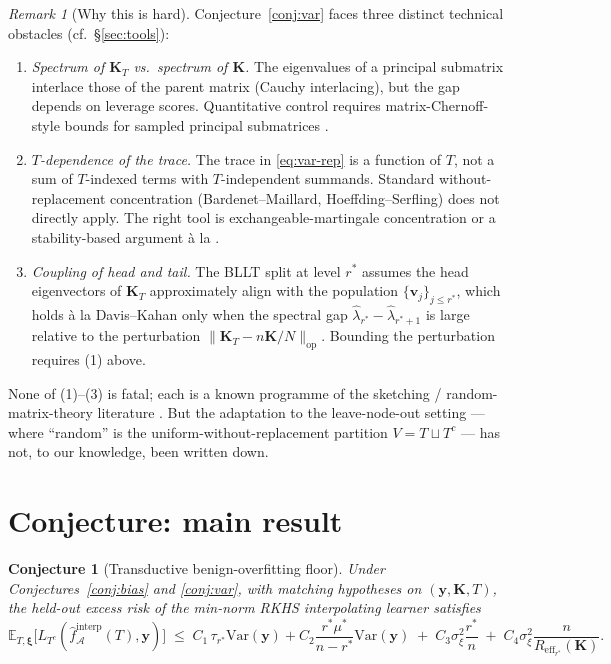 \documentclass[11pt,a4paper]{article}
\theoremstyle{plain}
\newtheorem{conjecture}[theorem]{Conjecture}
\theoremstyle{definition}
\theoremstyle{remark}
\newtheorem{remark}[theorem]{Remark}
\newcommand{\by}{\mathbf{y}}
\newcommand{\bxi}{\boldsymbol{\xi}}
\newcommand{\bK}{\mathbf{K}}
\newcommand{\bv}{\mathbf{v}}
\newcommand{\E}{\mathbb{E}}
\newcommand{\Var}{\mathrm{Var}}
\newcommand{\Acal}{\mathcal{A}}
\newcommand{\Reff}{R_{\mathrm{eff}}}
\begin{document}
\begin{remark}[Why this is hard]
\label{rem:var-discussion}
Conjecture~\ref{conj:var} faces three distinct technical
obstacles (cf.\ \S\ref{sec:tools}):
\begin{enumerate}[label=(\arabic*),leftmargin=*]
\item \emph{Spectrum of $\bK_T$ vs.\ spectrum of $\bK$.} The
    eigenvalues of a principal submatrix interlace those of the
    parent matrix (Cauchy interlacing), but the gap depends on
    leverage scores. Quantitative control requires
    matrix-Chernoff-style bounds for sampled
    principal submatrices \citep{Tropp2012,Cohen2016sparsification}.
\item \emph{$T$-dependence of the trace.} The trace in
    \eqref{eq:var-rep} is a function of $T$, not a sum of
    $T$-indexed terms with $T$-independent summands. Standard
    without-replacement concentration (Bardenet--Maillard,
    Hoeffding--Serfling) does not directly apply. The right tool
    is exchangeable-martingale concentration or a stability-based
    argument \`a la \citet{BousquetElisseeff2002}.
\item \emph{Coupling of head and tail.} The BLLT split at level
    $r^*$ assumes the head eigenvectors of $\bK_T$ approximately
    align with the population $\{\bv_j\}_{j \le r^*}$, which holds
    \`a la Davis--Kahan only when the spectral gap
    $\hat\lambda_{r^*} - \hat\lambda_{r^*+1}$ is large relative to
    the perturbation $\|\bK_T - n\bK/N\|_{\mathrm{op}}$. Bounding the
    perturbation requires (1) above.
\end{enumerate}
None of (1)--(3) is fatal; each is a known programme of the
sketching / random-matrix-theory literature
\citep{MahoneyDrineas2009,DerezinskiLiaoDoblerMahoney2020}. But the
adaptation to the leave-node-out setting --- where ``random'' is
the uniform-without-replacement partition $V = T \sqcup T^c$ --- has
not, to our knowledge, been written down.
\end{remark}

\section{Conjecture: main result}
\label{sec:main-conjecture}

\begin{conjecture}[Transductive benign-overfitting floor]
\label{conj:main}
Under Conjectures~\ref{conj:bias} and \ref{conj:var}, with
matching hypotheses on $(\by, \bK, T)$, the held-out excess risk of
the min-norm RKHS interpolating learner satisfies
\begin{equation}
    \E_{T,\bxi}\!\big[L_{T^c}(\hat f^{\mathrm{interp}}_\Acal(T), \by)\big]
    \;\le\;
    C_1\,\tau_{r^*}\Var(\by) + C_2\frac{r^*\mu^*}{n-r^*}\Var(\by)
    \;+\; C_3\sigma_\xi^2\frac{r^*}{n}
    \;+\; C_4\sigma_\xi^2\frac{n}{\Reff_{r^*}(\bK)}.
    \label{eq:main-conjecture}
\end{equation}
\end{conjecture}
\end{document}
